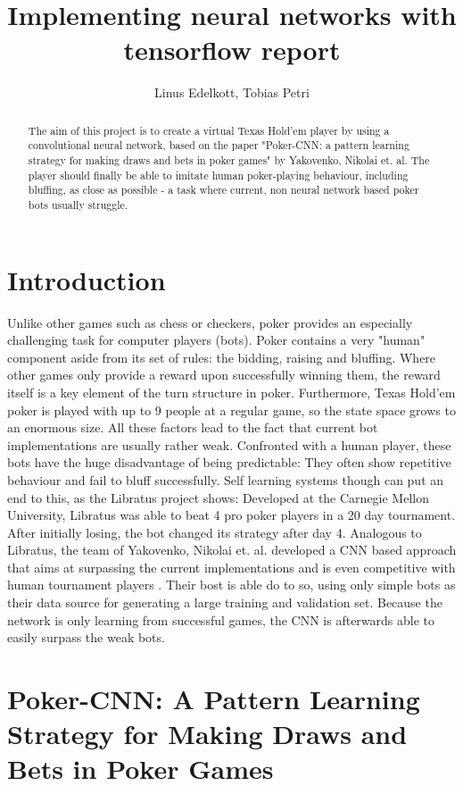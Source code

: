 \documentclass[]{report}
\title{Implementing neural networks with tensorflow report}
\author{Linus Edelkott, Tobias Petri}
\begin{document}
\maketitle

\begin{abstract}
The aim of this project is to create a virtual Texas Hold'em player by using a convolutional neural network, based on the paper "Poker-CNN: a pattern learning strategy for making draws and bets in poker games" \cite{1} by Yakovenko, Nikolai et. al.
The player should finally be able to imitate human poker-playing behaviour, including bluffing, as close as possible - a task where current, non neural network based poker bots usually struggle.
\end{abstract}


\section{Introduction}
Unlike other games such as chess or checkers, poker provides an especially challenging task for computer players (bots). Poker contains a very "human" component aside from its set of rules: the bidding, raising and bluffing. Where other games only provide a reward upon successfully winning them, the reward itself is a key element of the turn structure in poker. Furthermore, Texas Hold'em poker is played with up to 9 people at a regular game, so the state space grows to an enormous size. 
All these factors lead to the fact that current bot implementations are usually rather weak. Confronted with a human player, these bots have the huge disadvantage of being predictable: They often show repetitive behaviour and fail to bluff successfully. Self learning systems though can put an end to this, as the Libratus project shows\cite{2}: Developed at the Carnegie Mellon University, Libratus was able to beat 4 pro poker players in a 20 day tournament. After initially losing, the bot changed its strategy after day 4. Analogous to Libratus, the team of Yakovenko, Nikolai et. al. developed a CNN based approach that aims at surpassing the current implementations and is even competitive with human tournament players \cite{1}. Their bost is able do to so, using only simple bots as their data source for generating a large training and validation set. Because the network is only learning from successful games, the CNN is afterwards able to easily surpass the weak bots.    

\section{Poker-CNN: A Pattern Learning Strategy for Making Draws and Bets in Poker Games}
\end{document}
